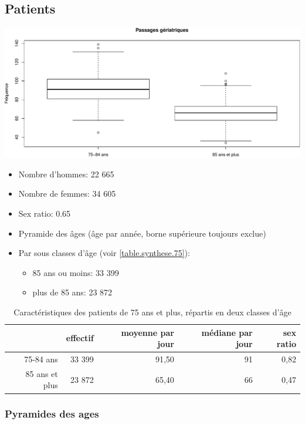 \documentclass[]{article}
\begin{document}
\subsection{Patients}\label{patients-2}

\includegraphics{Figs/sexe75-1.pdf}

\begin{itemize}
\item
  Nombre d'hommes: 22 665
\item
  Nombre de femmes: 34 605
\item
  Sex ratio: 0.65
\item
  Pyramide des âges (âge par année, borne supérieure toujours exclue)
\item
  Par sous classes d'âge (voir \ref{table.synthese.75}):

  \begin{itemize}
  \itemsep1pt\parskip0pt
  \item
    85 ans ou moins: 33 399
  \item
    plus de 85 ans: 23 872
  \end{itemize}
\end{itemize}

\begin{table}[ht]
\centering
\begin{tabular}{rrrrr}
  \hline
 & effectif & moyenne par jour  & médiane par jour & sex ratio \\ 
  \hline
75-84 ans & 33 399 & 91,50 &  91 & 0,82 \\ 
  85 ans et plus & 23 872 & 65,40 &  66 & 0,47 \\ 
   \hline
\end{tabular}
\caption{Caractéristiques des patients de 75 ans et plus, répartis en deux classes d'âge} 
\end{table}

\subsubsection{Pyramides des ages}\label{pyramides-des-ages}
\end{document}
